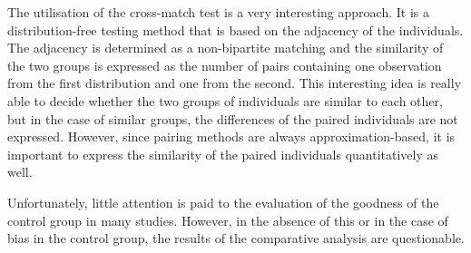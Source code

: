 


The utilisation of the cross-match test \cite{rosenbaum2005exact} is a very interesting approach. It is a distribution-free testing method that is based on the adjacency of the individuals. The adjacency is determined as a non-bipartite matching and the similarity of the two groups is expressed as the number of pairs containing one observation from the first distribution and one from the second. This interesting idea is really able to decide whether the two groups of individuals are similar to each other, but in the case of similar groups, the differences of the paired individuals are not expressed. However, since pairing methods are always approximation-based, it is important to express the similarity of the paired individuals quantitatively as well. 

Unfortunately, little attention is paid to the evaluation of the goodness of the control group in many studies. However, in the absence of this or in the case of bias in the control group, the results of the comparative analysis are questionable.



